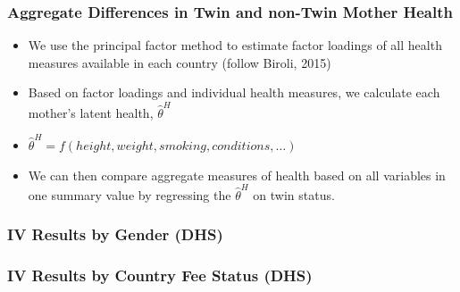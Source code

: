 \documentclass[9pt,letterpaper,subeqn]{beamer}
\begin{document}
\begin{frame}[label=factors]
\frametitle{Aggregate Differences in Twin and non-Twin Mother Health}
  \begin{table}
  \caption{Difference in Aggregate Health Between Twin and non-Twin Mothers}
\end{table}
\begin{itemize}
\item We use the principal factor method to estimate factor loadings of all health
  measures available in each country (follow Biroli, 2015)
\item Based on factor loadings and individual health measures, we calculate each mother's latent health, $\hat\theta^H$
\item $\hat\theta^H = f(height,weight,smoking,conditions,\ldots)$
\item We can then compare aggregate measures of health based on all variables in one summary value by regressing the $\hat\theta^H$ on twin status.
\end{itemize}

  
\hyperlink{effects}{}
\end{frame}

\begin{frame}[label=TwinDeathSpain]

\hyperlink{mech}{}
\end{frame}

\begin{frame}[label=DHSGender]
  \frametitle{IV Results by Gender (DHS)}

\hyperlink{IV}{}
\end{frame}

\begin{frame}[label=IVFees]
  \frametitle{IV Results by Country Fee Status (DHS)}

\hyperlink{IV}{}
\end{frame}
\end{document}

